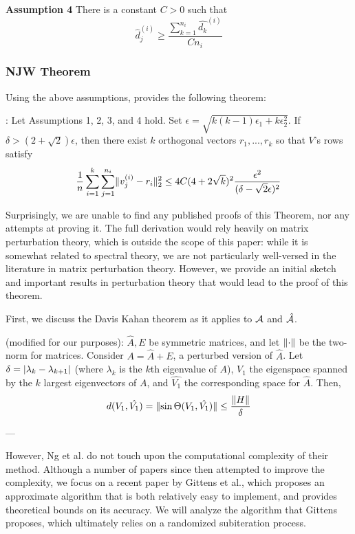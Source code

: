 \textbf{Assumption 4}
    There is a constant $C > 0$ such that
\[ \hat{d}_j^{(i)} \geq \frac{\sum_{k=1}^{n_i} \hat{d_k}^{(i)}}{Cn_i} \]


\subsubsection{NJW Theorem}
Using the above assumptions, \cite{ng2002spectral} provides the following
theorem:


: Let Assumptions 1, 2, 3, and 4 hold. Set
$\epsilon = \sqrt{k(k-1)\epsilon_1 + k \epsilon_2^2}$. If
$\delta > (2 + \sqrt{2}) \epsilon$, then there exist $k$ orthogonal vectors
$r_1, ..., r_k$ so that $V$'s rows satisfy
\[ \frac{1}{n} \sum_{i=1}^k \sum_{j=1}^{n_i} \lVert v_j^{(i)} - r_i\rVert_2^2 \leq
    4C (4 + 2 \sqrt{k})^2 \frac{\epsilon^2}{(\delta - \sqrt{2}\epsilon)^2} \]

Surprisingly, we are unable to find any published proofs of this Theorem, nor
any attempts at proving it. The full derivation would rely heavily on matrix
perturbation theory, which is outside the scope of this paper: while it is
somewhat related to spectral theory, we are not particularly well-versed in the
literature in matrix perturbation theory. However, we provide an initial sketch
and important results in perturbation theory that would lead to the proof of
this theorem.

First, we discuss the Davis Kahan theorem as it applies to $\mathcal{A}$ and $\hat{\mathcal{A}}$.

 (modified for our purposes):
$\hat{A}, E$ be symmetric matrices, and let $\lVert\cdot\rVert$ be the two-norm for
matrices. Consider $A = \hat{A} + E$, a perturbed version of $\hat{A}$. Let
$\delta = \lvert\lambda_k - \lambda_{k+1}\rvert$ (where $\lambda_k$ is the $k$th
eigenvalue of $A$), $V_1$ the eigenspace spanned by the $k$ largest eigenvectors
of $A$, and $\hat{V_1}$ the corresponding space for $\hat{A}$. Then,
\[ d(V_1, \hat{V_1}) = \lVert\sin \Theta(V_1, \hat{V_1})\rVert \leq \frac{\lVert H\rVert}{\delta} \]

---

However, Ng et al. do not touch upon the computational complexity of their
method. Although a number of papers since then attempted to improve the
complexity, we focus on a recent paper by Gittens et
al.\cite{gittens2013approximate}, which proposes an approximate algorithm that
is both relatively easy to implement, and provides theoretical bounds on its
accuracy. We will analyze the algorithm that Gittens proposes, which ultimately
relies on a randomized subiteration process.
